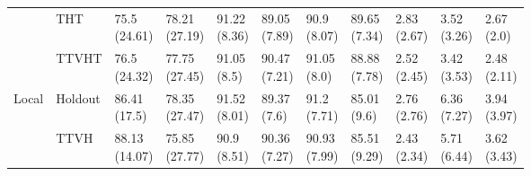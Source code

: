 \begin{table}
\begin{tabular}{lllllllllll}
       & THT &   \makecell{75.5\\(24.61)} &  \makecell{78.21\\(27.19)} &   \makecell{91.22\\(8.36)} &  \makecell{89.05\\(7.89)} &   \makecell{90.9\\(8.07)} &  \makecell{89.65\\(7.34)} &      \makecell{2.83\\(2.67)} &  \makecell{3.52\\(3.26)} &   \makecell{2.67\\(2.0)} \\
       & TTVHT &   \makecell{76.5\\(24.32)} &  \makecell{77.75\\(27.45)} &    \makecell{91.05\\(8.5)} &  \makecell{90.47\\(7.21)} &   \makecell{91.05\\(8.0)} &  \makecell{88.88\\(7.78)} &      \makecell{2.52\\(2.45)} &  \makecell{3.42\\(3.53)} &  \makecell{2.48\\(2.11)} \\
Local & Holdout &   \makecell{86.41\\(17.5)} &  \makecell{78.35\\(27.47)} &   \makecell{91.52\\(8.01)} &   \makecell{89.37\\(7.6)} &   \makecell{91.2\\(7.71)} &   \makecell{85.01\\(9.6)} &      \makecell{2.76\\(2.76)} &  \makecell{6.36\\(7.27)} &  \makecell{3.94\\(3.97)} \\
       & TTVH &  \makecell{88.13\\(14.07)} &  \makecell{75.85\\(27.77)} &    \makecell{90.9\\(8.51)} &  \makecell{90.36\\(7.27)} &  \makecell{90.93\\(7.99)} &  \makecell{85.51\\(9.29)} &      \makecell{2.43\\(2.34)} &  \makecell{5.71\\(6.44)} &  \makecell{3.62\\(3.43)} \\

\end{tabular}
\end{table}
